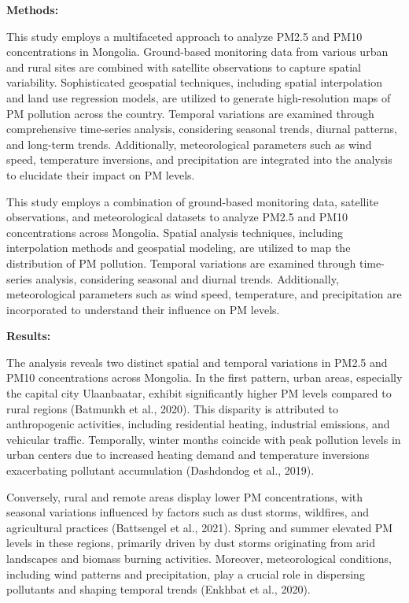 \documentclass[
  number]{elsarticle}
\begin{document}
\textbf{Methods:}

This study employs a multifaceted approach to analyze PM2.5 and PM10
concentrations in Mongolia. Ground-based monitoring data from various
urban and rural sites are combined with satellite observations to
capture spatial variability. Sophisticated geospatial techniques,
including spatial interpolation and land use regression models, are
utilized to generate high-resolution maps of PM pollution across the
country. Temporal variations are examined through comprehensive
time-series analysis, considering seasonal trends, diurnal patterns, and
long-term trends. Additionally, meteorological parameters such as wind
speed, temperature inversions, and precipitation are integrated into the
analysis to elucidate their impact on PM levels.

This study employs a combination of ground-based monitoring data,
satellite observations, and meteorological datasets to analyze PM2.5 and
PM10 concentrations across Mongolia. Spatial analysis techniques,
including interpolation methods and geospatial modeling, are utilized to
map the distribution of PM pollution. Temporal variations are examined
through time-series analysis, considering seasonal and diurnal trends.
Additionally, meteorological parameters such as wind speed, temperature,
and precipitation are incorporated to understand their influence on PM
levels.

\textbf{Results:}

The analysis reveals two distinct spatial and temporal variations in
PM2.5 and PM10 concentrations across Mongolia. In the first pattern,
urban areas, especially the capital city Ulaanbaatar, exhibit
significantly higher PM levels compared to rural regions (Batmunkh et
al., 2020). This disparity is attributed to anthropogenic activities,
including residential heating, industrial emissions, and vehicular
traffic. Temporally, winter months coincide with peak pollution levels
in urban centers due to increased heating demand and temperature
inversions exacerbating pollutant accumulation (Dashdondog et al.,
2019).

Conversely, rural and remote areas display lower PM concentrations, with
seasonal variations influenced by factors such as dust storms,
wildfires, and agricultural practices (Battsengel et al., 2021). Spring
and summer elevated PM levels in these regions, primarily driven by dust
storms originating from arid landscapes and biomass burning activities.
Moreover, meteorological conditions, including wind patterns and
precipitation, play a crucial role in dispersing pollutants and shaping
temporal trends (Enkhbat et al., 2020).
\end{document}
